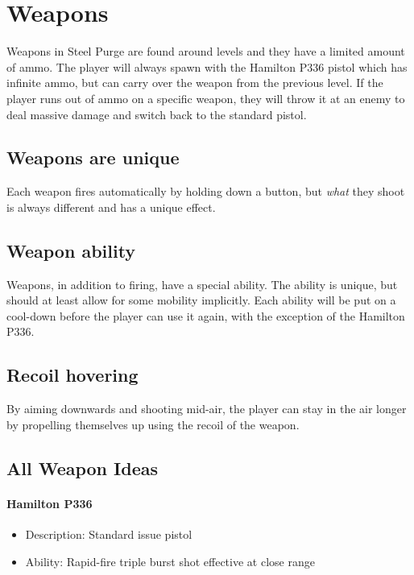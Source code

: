 \documentclass[../Main.tex]{subfiles}
\begin{document}
\section{Weapons}

Weapons in Steel Purge are found around levels and they have a limited amount of ammo. The player will always spawn with the Hamilton P336 pistol which has infinite ammo, but can carry over the weapon from the previous level. If the player runs out of ammo on a specific weapon, they will throw it at an enemy to deal massive damage and switch back to the standard pistol. 

\subsection{Weapons are unique}

Each weapon fires automatically by holding down a button, but \emph{what} they shoot is always different and has a unique effect. 

\subsection{Weapon ability}

Weapons, in addition to firing, have a special ability. The ability is unique, but should at least allow for some mobility implicitly. Each ability will be put on a cool-down before the player can use it again, with the exception of the Hamilton P336.

\subsection{Recoil hovering}

By aiming downwards and shooting mid-air, the player can stay in the air longer by propelling themselves up using the recoil of the weapon. 

\subsection{All Weapon Ideas}

\paragraph{Hamilton P336}

\begin{itemize}
	\item Description: Standard issue pistol
	\item Ability: Rapid-fire triple burst shot effective at close range
\end{itemize} 
\end{document}
